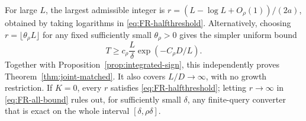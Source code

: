 For large $L$, the largest admissible integer is
$r=(L-\log L+O_\rho(1))/(2a)$, obtained by taking logarithms in \eqref{eq:FR-halfthreshold}. Alternatively, choosing $r=\lfloor\theta_\rho L\rfloor$ for any fixed sufficiently small $\theta_\rho>0$ gives the simpler uniform bound
\begin{equation}\label{eq:FR-simple}
 T\geq c_\rho\frac L\delta\exp(-C_\rho D/L).
\end{equation}
Together with Proposition~\ref{prop:integrated-sign}, this independently proves Theorem~\ref{thm:joint-matched}. It also covers $L/D\to\infty$, with no growth restriction. If $K=0$, every $r$ satisfies \eqref{eq:FR-halfthreshold}; letting $r\to\infty$ in \eqref{eq:FR-all-bound} rules out, for sufficiently small $\delta$, any finite-query converter that is exact on the whole interval $[\delta,\rho\delta]$.

